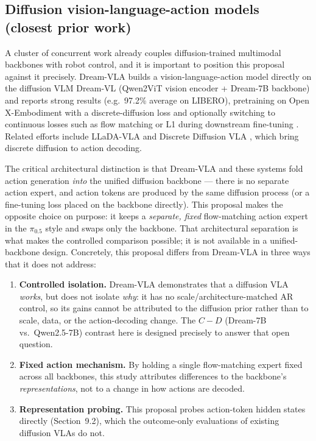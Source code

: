 \documentclass[11pt]{article}
\begin{document}
\subsection{Diffusion vision-language-action models (closest prior work)}
\label{sec:diffusion-vla}

A cluster of concurrent work already couples diffusion-trained multimodal backbones with robot control, and it is important to position this proposal against it precisely. Dream-VLA builds a vision-language-action model directly on the diffusion VLM Dream-VL (Qwen2ViT vision encoder + Dream-7B backbone) and reports strong results (e.g.\ 97.2\% average on LIBERO), pretraining on Open X-Embodiment with a discrete-diffusion loss and optionally switching to continuous losses such as flow matching or L1 during downstream fine-tuning \cite{dreamvla}. Related efforts include LLaDA-VLA \cite{lladavla} and Discrete Diffusion VLA \cite{discretediffvla}, which bring discrete diffusion to action decoding.

The critical architectural distinction is that Dream-VLA and these systems fold action generation \emph{into} the unified diffusion backbone --- there is no separate action expert, and action tokens are produced by the same diffusion process (or a fine-tuning loss placed on the backbone directly). This proposal makes the opposite choice on purpose: it keeps a \emph{separate, fixed} flow-matching action expert in the $\pi_{0.5}$ style and swaps only the backbone. That architectural separation is what makes the controlled comparison possible; it is not available in a unified-backbone design. Concretely, this proposal differs from Dream-VLA in three ways that it does not address:

\begin{enumerate}
    \item \textbf{Controlled isolation.} Dream-VLA demonstrates that a diffusion VLA \emph{works}, but does not isolate \emph{why}: it has no scale/architecture-matched AR control, so its gains cannot be attributed to the diffusion prior rather than to scale, data, or the action-decoding change. The $C - D$ (Dream-7B vs.\ Qwen2.5-7B) contrast here is designed precisely to answer that open question.
    \item \textbf{Fixed action mechanism.} By holding a single flow-matching expert fixed across all backbones, this study attributes differences to the backbone's \emph{representations}, not to a change in how actions are decoded.
    \item \textbf{Representation probing.} This proposal probes action-token hidden states directly (Section~9.2), which the outcome-only evaluations of existing diffusion VLAs do not.
\end{enumerate}
\end{document}
